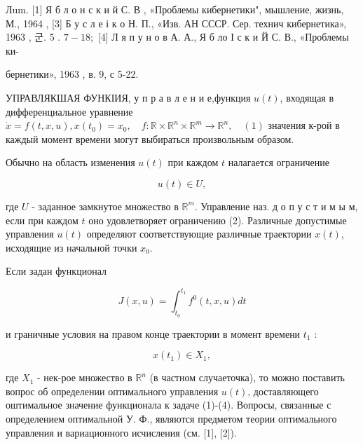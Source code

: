 \documentclass[10pt]{article}
\begin{document}
Лum. [1] Я б л о н с к и й С. В , «Проблемы кибернетики", мышление, жизнь, М., 1964 , [3] Б у с л е і к о Н. П., «Изв. АН СССР. Сер. технич кибернетика», 1963 , 군. 5 . $7-18 ;$ [4] Л я п у н о в А. А., Я б ло І с к и Й С. В., «Проблемы ки-

бернетики», 1963 , в. 9, с 5-22.



УПРАВЛЯКШАЯ ФУНКІИЯ, у п р а в л е н и е,функция $u(t)$, входящая в дифференциальное уравнение $\dot{x}=f(t, x, u), x\left(t_{0}\right)=x_{0}, \quad f: \mathbb{R} \times \mathbb{R}^{n} \times \mathbb{R}^{m} \longrightarrow \mathbb{R}^{n}, \quad(1)$ значения к-рой в каждый момент времени могут выбираться произвольным образом.



Обычно на область изменения $u(t)$ при каждом $t$ налагается ограничение



\[

u(t) \in U,

\]



где $U$ - заданное замкнутое множество в $\mathbb{R}^{m}$. Управление наз. д о п у с т и м ы м, если при каждом $t$ оно удовлетворяет ограничению (2). Различные допустимые управления $u(t)$ определяют соответствующие различные траектории $x(t)$, исходящие из начальной точки $x_{0}$.



Если задан функционал



\[

J(x, u)=\int_{t_{0}}^{t_{1}} f^{0}(t, x, u) d t

\]



и граничные условия на правом конце траектории в момент времени $t_{1}$ :



\[

x\left(t_{1}\right) \in X_{1},

\]



где $X_{1}$ - нек-рое множество в $\mathbb{R}^{n}$ (в частном случаеточка), то можно поставить вопрос об определении оптимального управления $u(t)$, доставляющего оштимальное значение функционала к задаче (1)-(4). Вопросы, связанные с определением оптимальной У. Ф., являются предметом теории оптимального управления и вариационного исчисления (см. [1], [2]).
\end{document}
